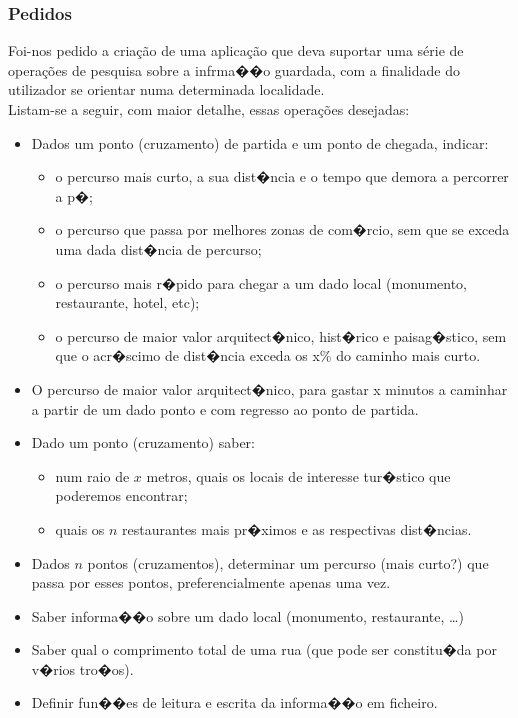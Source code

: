 \documentclass[11pt,a4paper]{article}
\newenvironment{mtc}{\secttoc\sectlof}{\pagebreak}
\begin{document}
\begin{mtc}
\subsubsection{Pedidos}
Foi-nos pedido a cria\c c\~ao de uma aplica\c c\~ao que deva suportar uma s\'erie de opera\c c\~oes de pesquisa sobre a infrma��o
guardada, com a finalidade do utilizador se orientar numa determinada localidade.
\\
Listam-se a seguir, com maior detalhe, essas opera\c c\~oes desejadas:

\begin{itemize}
    \item Dados um ponto (cruzamento) de partida e um ponto de chegada, indicar:
        \begin{itemize}
            \item o percurso mais curto, a sua dist�ncia e o tempo que demora a percorrer a p�;
            \item o percurso que passa por melhores zonas de com�rcio, sem que se exceda uma dada dist�ncia de percurso;
            \item o percurso mais r�pido para chegar a um dado local (monumento, restaurante, hotel, etc);
            \item o percurso de maior valor arquitect�nico, hist�rico e paisag�stico, sem que o acr�scimo de dist�ncia exceda os x\% do caminho mais curto.
        \end{itemize}
    \item O percurso de maior valor arquitect�nico, para gastar x minutos a caminhar a partir de um dado ponto e com regresso ao ponto de partida.
    \item Dado um ponto (cruzamento) saber:
        \begin{itemize}
         \item num raio de $x$ metros, quais os locais de interesse tur�stico que poderemos encontrar;
         \item quais os $n$ restaurantes mais pr�ximos e as respectivas dist�ncias.
        \end{itemize}
    \item Dados $n$ pontos (cruzamentos), determinar um percurso (mais curto?) que passa por esses pontos, preferencialmente apenas uma vez.
    \item Saber informa��o sobre um dado local (monumento, restaurante, \ldots)
    \item Saber qual o comprimento total de uma rua (que pode ser constitu�da por v�rios tro�os).
    \item Definir fun��es de leitura e escrita da informa��o em ficheiro.
\end{itemize}
\end{mtc}
\end{document}
